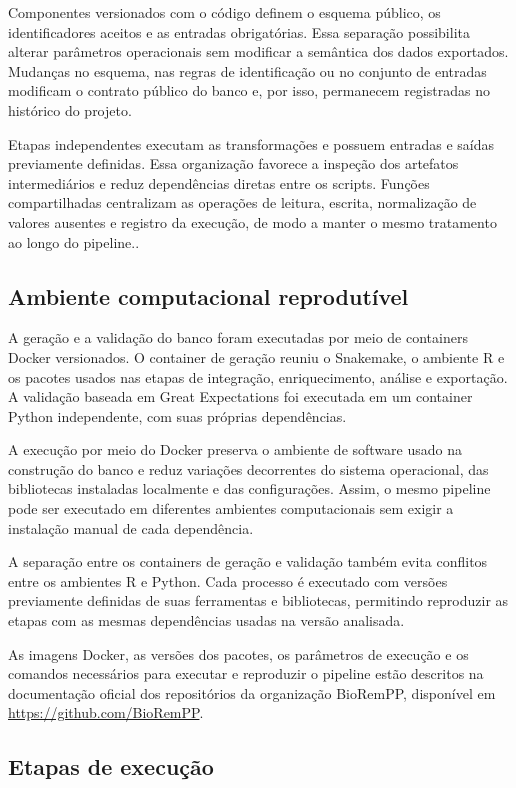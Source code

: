 Componentes versionados com o código definem o esquema público, os
identificadores aceitos e as entradas obrigatórias. Essa separação possibilita
alterar parâmetros operacionais sem modificar a semântica dos dados
exportados. Mudanças no esquema, nas regras de identificação ou no conjunto de
entradas modificam o contrato público do banco e, por isso, permanecem
registradas no histórico do projeto.

Etapas independentes executam as transformações e possuem entradas e saídas
previamente definidas. Essa organização favorece a inspeção dos artefatos
intermediários e reduz dependências diretas entre os scripts. Funções
compartilhadas centralizam as operações de leitura, escrita, normalização de
valores ausentes e registro da execução, de modo a manter o mesmo tratamento
ao longo do pipeline..


\subsection{Ambiente computacional reprodutível}

A geração e a validação do banco foram executadas por meio de containers
Docker versionados. O container de geração reuniu o Snakemake, o ambiente R e
os pacotes usados nas etapas de integração, enriquecimento, análise e
exportação. A validação baseada em Great Expectations foi executada em um
container Python independente, com suas próprias dependências.

A execução por meio do Docker preserva o ambiente de software usado na
construção do banco e reduz variações decorrentes do sistema operacional, das
bibliotecas instaladas localmente e das configurações.
Assim, o mesmo pipeline pode ser executado em diferentes ambientes
computacionais sem exigir a instalação manual de cada dependência.

A separação entre os containers de geração e validação também evita conflitos
entre os ambientes R e Python. Cada processo é executado com versões
previamente definidas de suas ferramentas e bibliotecas, permitindo reproduzir
as etapas com as mesmas dependências usadas na versão analisada.

As imagens Docker, as versões dos pacotes, os parâmetros de execução e os
comandos necessários para executar e reproduzir o pipeline estão descritos na
documentação oficial dos repositórios da organização BioRemPP, disponível em
\url{https://github.com/BioRemPP}.



\subsection{Etapas de execução}

